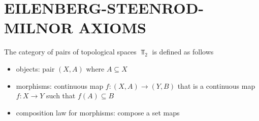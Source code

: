 \documentclass{report}
\begin{document}
\section{EILENBERG-STEENROD-MILNOR AXIOMS}

\begin{definition}
    The category of pairs of topological spaces $\Top_2$ is defined as follows
    \begin{itemize}
        \item objects: pair $(X, A)$ where $A \subseteq X$
        \item morphisms: continuous map $f: (X, A) \to (Y, B)$ that is a continuous map $f: X \to Y$ such that $f(A) \subseteq B$ 
        \item composition law for morphisms: compose a set maps
    \end{itemize}
\end{definition}
\end{document}
